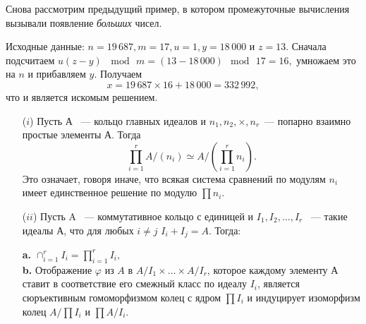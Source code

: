     \begin{beznomera}
    \hspace*{0.5cm}
    Снова рассмотрим предыдущий пример, в котором промежуточные вычисления вызывали появление \textit{больших} чисел.

    Исходные данные: $n = 19\,687, m = 17, u = 1, y = 18\,000$ и $z = 13$. Сначала подсчитаем $u(z - y)\,\mod\,m = (13 - 18\,000)\!\mod\,17 = 16,$ умножаем это на $n$ и прибавляем $y$. Получаем
    $$x = 19\,687 \times 16 + 18\,000 = 332\,992,$$
    что и является искомым решением.
    \end{beznomera}

    \begin{thm}
    \hspace*{0.01cm}
    \begin{itemize}
    \item[($i$)] Пусть А ~— кольцо главных идеалов и $n_1, n_2, \times, n_r$~— попарно взаимно простые элементы А. Тогда
    $$\prod\limits_{i=1}^{r} A/(n_i) \simeq A/(\prod\limits_{i=1}^{r} n_i).$$
    Это означает, говоря иначе, что всякая система сравнений по модулям $n_i$ имеет единственное решение по модулю $\prod n_i$.

    \item[($ii$)]Пусть A ~— коммутативное кольцо с единицей и $I_1, I_2, \ldots, I_r$ ~— такие идеалы А, что для любых $i \ne j\,\,I_i + I_j = A$. Тогда:

    {\bfseries a.\;} $\cap_{i = 1}^{r} I_i = \prod\nolimits_{i=1}^{r}I_i,$\\
    {\bfseries b.\;} Отображение $\varphi$ из $A$ в $A/I_1 \times \ldots \times A/I_r$, которое каждому элементу А ставит в соответствие его смежный класс по идеалу $I_i$, является сюръективным гомоморфизмом колец с ядром $\prod I_i$ и индуцирует изоморфизм колец $A/\prod I_i$ и $\prod A/I_i$.
    \end{itemize}
    \end{thm}

